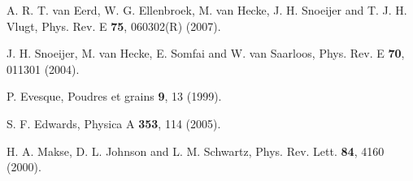 \begin{thebibliography}{50}
 A. R. T. van Eerd,  W. G. Ellenbroek, M. van Hecke, J. H. Snoeijer and T. J. H. Vlugt, Phys. Rev. E \textbf{75}, 060302(R) (2007).

 J. H. Snoeijer, M. van Hecke, E. Somfai and W. van Saarloos, Phys. Rev. E \textbf{70}, 011301 (2004). 

 P. Evesque, Poudres et grains \textbf{9}, 13 (1999).

 S. F. Edwards, Physica A \textbf{353}, 114 (2005).

 H. A. Makse, D. L. Johnson and L. M. Schwartz, Phys. Rev. Lett. \textbf{84}, 4160 (2000).

\end{thebibliography}





